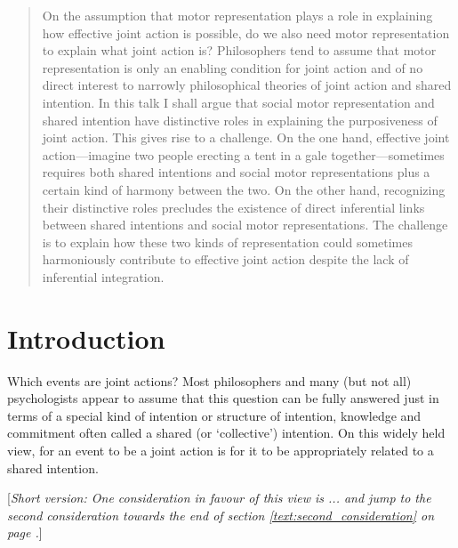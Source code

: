 \documentclass[12pt,\papersize]{extarticle}
\begin{document}
\setlength\footnotesep{1em}


\maketitle
\title{}

\begin{abstract}
\noindent
On the assumption that motor representation plays a role in explaining how effective joint action is possible, do we also need motor representation to explain what joint action is? Philosophers tend to assume that motor representation is only an enabling condition for joint action and of no direct interest to narrowly philosophical theories of joint action and shared intention. In this talk I shall argue that social motor representation and shared intention have distinctive roles in explaining the purposiveness of joint action. This gives rise to a challenge. On the one hand, effective joint action—imagine two people erecting a tent in a gale together—sometimes requires both shared intentions and social motor representations plus a certain kind of harmony between the two. On the other hand, recognizing their distinctive roles precludes the existence of direct inferential links between shared intentions and social motor representations. The challenge is to explain how these two kinds of representation could sometimes harmoniously contribute to effective joint action despite the lack of inferential integration. 
\end{abstract}

\section{Introduction}
Which events are joint actions?
Most philosophers and many (but not all) psychologists appear to assume that this question can be fully answered just in terms of a special kind of intention or structure of intention, knowledge and commitment often called a shared (or `collective') intention.
On this widely held view, for an event to be a joint action is for it to be appropriately related to a shared intention.

[\textit{Short version: One consideration in favour of this view is ... and jump to the second consideration towards the end of  section \ref{text:second_consideration} on page .}]
\end{document}
